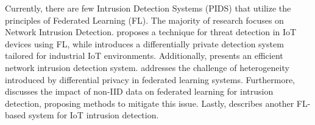  Currently, there are few Intrusion Detection Systems (PIDS) that utilize the principles of Federated Learning (FL). The majority of research focuses on Network Intrusion Detection. \cite{man2021intelligent} proposes a technique for threat detection in IoT devices using FL, while \cite{friha20232df} introduces a differentially private detection system tailored for industrial IoT environments. Additionally, \cite{li2023efficient} presents an efficient network intrusion detection system. \cite{yang2023privatefl} addresses the challenge of heterogeneity introduced by differential privacy in federated learning systems. Furthermore, \cite{guo2023new} discusses the impact of non-IID data on federated learning for intrusion detection, proposing methods to mitigate this issue. Lastly, \cite{chaabene2023privacy} describes another FL-based system for IoT intrusion detection.


